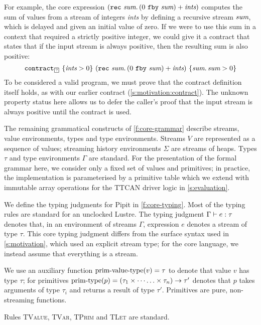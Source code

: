For example, the core expression $(\texttt{rec}~\textit{sum}.\, (0~\texttt{fby}~\textit{sum}) + \textit{ints})$ computes the sum of values from a stream of integers \emph{ints} by defining a recursive stream $\textit{sum}$, which is delayed and given an initial value of zero.
If we were to use this sum in a context that required a strictly positive integer, we could give it a contract that states that if the input stream is always positive, then the resulting sum is also positive:
$$
\sumcontract
$$
To be considered a valid program, we must prove that the contract definition itself holds, as with our earlier contract (\autoref{s:motivation:contract}).
The unknown property status here allows us to defer the caller's proof that the input stream is always positive until the contract is used.


The remaining grammatical constructs of \autoref{f:core-grammar} describe streams, value environments, types and type environments.
Streams $V$ are represented as a sequence of values; streaming history environments $\Sigma$ are streams of heaps.
Types $\tau$ and type environments $\Gamma$ are standard.
For the presentation of the formal grammar here, we consider only a fixed set of values and primitives; in practice, the implementation is parameterised by a primitive table which we extend with immutable array operations for the TTCAN driver logic in \autoref{s:evaluation}.



We define the typing judgments for Pipit in \autoref{f:core-typing}.
Most of the typing rules are standard for an unclocked Lustre.
The typing judgment $\Gamma \vdash e : \tau$ denotes that, in an environment of streams $\Gamma$, expression $e$ denotes a stream of type $\tau$.
This core typing judgment differs from the surface syntax used in \autoref{s:motivation}, which used an explicit stream type; for the core language, we instead assume that everything is a stream.

We use an auxiliary function $\text{prim-value-type}(v) = \tau$ to denote that value $v$ has type $\tau$; for primitives $\text{prim-type}(p) = (\tau_1 \times \cdots \hdots \times \tau_n) \to \tau'$ denotes that $p$ takes arguments of type $\tau_i$ and returns a result of type $\tau'$.
Primitives are pure, non-streaming functions.

Rules \textsc{TValue}, \textsc{TVar}, \textsc{TPrim} and \textsc{TLet} are standard.

